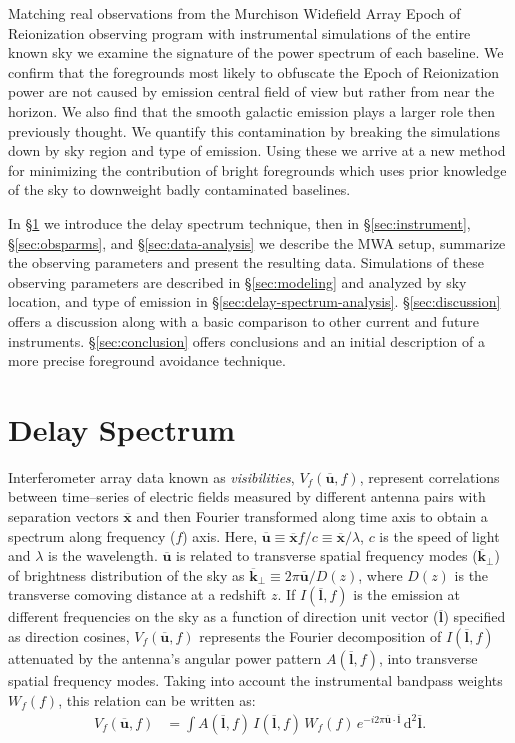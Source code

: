 \documentclass[preprint2,iop,numberedappendix]{emulateapj}
\newcommand{\dif}{\mathrm{d}}
\begin{document}
 Matching real observations from the Murchison Widefield Array Epoch of Reionization observing program with instrumental simulations of the entire known sky we examine the signature of the power spectrum of each baseline.  We confirm that the foregrounds most likely to obfuscate the Epoch of Reionization power are not caused by emission central field of view but rather from near the horizon. We also find that the smooth galactic emission plays a larger role then previously thought. We quantify this contamination by breaking the simulations down by sky region and type of emission. Using these we arrive at a new method for minimizing the contribution of bright foregrounds which uses prior knowledge of the sky to downweight badly contaminated baselines.

In \S\ref{sec:delay-spectrum} we introduce the delay spectrum technique, then in  \S\ref{sec:instrument}, \S\ref{sec:obsparms}, and \S\ref{sec:data-analysis} we describe the MWA setup, summarize the observing parameters and present the resulting data.  Simulations of these observing parameters are described in \S\ref{sec:modeling} and analyzed by sky location, and type of emission in \S\ref{sec:delay-spectrum-analysis}.  \S\ref{sec:discussion} offers a discussion along with a basic comparison to other current and future instruments. \S\ref{sec:conclusion} offers conclusions and an initial description of a more precise foreground avoidance technique.

\section{Delay Spectrum}\label{sec:delay-spectrum}

Interferometer array data known as {\it visibilities}, $V_f(\overline{\mathbf{u}},f)$, represent correlations between time--series of electric fields measured by different antenna pairs with separation vectors $\overline{\mathbf{x}}$ and then Fourier transformed along time axis to obtain a spectrum along frequency ($f$) axis. Here, $\overline{\mathbf{u}}\equiv \overline{\mathbf{x}}f/c \equiv \overline{\mathbf{x}}/\lambda$, $c$ is the speed of light and $\lambda$ is the wavelength. $\overline{\mathbf{u}}$ is related to transverse spatial frequency modes ($\overline{\mathbf{k}}_\perp$) of brightness distribution of the sky as $\overline{\mathbf{k}}_\perp \equiv 2\pi\overline{\mathbf{u}}/D(z)$, where $D(z)$ is the transverse comoving distance at a redshift $z$. If $I(\overline{\mathbf{l}},f)$ is the emission at different frequencies on the sky as a function of direction unit vector ($\overline{\mathbf{l}}$) specified as direction cosines, $V_f(\overline{\mathbf{u}},f)$ represents the Fourier decomposition of $I(\overline{\mathbf{l}},f)$ attenuated by the antenna's angular power pattern $A(\overline{\mathbf{l}},f)$, into transverse spatial frequency modes. Taking into account the instrumental bandpass weights $W_f(f)$, this relation can be written as:
\begin{align}\label{eqn:obsvis}
  V_f(\overline{\mathbf{u}},f) &= \int A(\overline{\mathbf{l}},f)\,I(\overline{\mathbf{l}},f)\,W_f(f)\,e^{-i2\pi \overline{\mathbf{u}}\cdot\overline{\mathbf{l}}}\,\dif^2 \overline{\mathbf{l}}.
\end{align}
\end{document}
